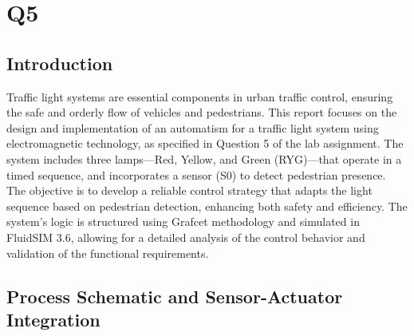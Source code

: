 \section{Q5} 

\subsection{Introduction} \label{sec:Introduction}

Traffic light systems are essential components in urban traffic control, ensuring the safe and orderly flow of 
vehicles and pedestrians. This report focuses on the design and implementation of an automatism for a traffic 
light system using electromagnetic technology, as specified in Question 5 of the lab assignment. The system 
includes three lamps—Red, Yellow, and Green (RYG)—that operate in a timed sequence, and incorporates a sensor 
(S0) to detect pedestrian presence. The objective is to develop a reliable control strategy that adapts the 
light sequence based on pedestrian detection, enhancing both safety and efficiency. The system’s logic is 
structured using Grafcet methodology and simulated in FluidSIM 3.6, allowing for a detailed analysis of the 
control behavior and validation of the functional requirements.

\subsection{Process Schematic and Sensor-Actuator Integration} \label{sec:Process_Schematic_and_Sensor-Actuator_Integration}

